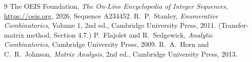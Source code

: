 \documentclass[11pt,a4paper]{article}
\theoremstyle{plain}
\theoremstyle{definition}
\begin{document}
\begin{thebibliography}{9}
 The OEIS Foundation, \emph{The On-Line Encyclopedia of Integer
Sequences}, \url{https://oeis.org}, 2026. Sequence A234452.
 R.~P.~Stanley, \emph{Enumerative Combinatorics}, Volume 1, 2nd ed.,
Cambridge University Press, 2011. (Transfer-matrix method, Section 4.7.)
 P.~Flajolet and R.~Sedgewick, \emph{Analytic Combinatorics}, Cambridge
University Press, 2009.
 R.~A.~Horn and C.~R.~Johnson, \emph{Matrix Analysis}, 2nd ed., Cambridge
University Press, 2013.
\end{thebibliography}
\end{document}

